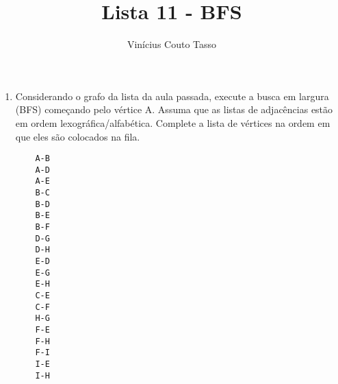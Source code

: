 \documentclass{article}
\title{Lista 11 - BFS}
\author{Vinícius Couto Tasso}
\date{}
\begin{document}
\maketitle
         
\begin{enumerate}

\item Considerando o grafo da lista da aula passada, execute a busca em largura (BFS) começando pelo vértice A. Assuma que as listas de adjacências estão em ordem lexográfica/alfabética. Complete a lista de vértices na ordem em que eles são colocados na fila.

\begin{verbatim}
    A-B
    A-D
    A-E
    B-C
    B-D
    B-E
    B-F
    D-G
    D-H
    E-D
    E-G
    E-H
    C-E
    C-F
    H-G
    F-E
    F-H
    F-I
    I-E
    I-H
\end{verbatim}

\end{enumerate}
\end{document}
